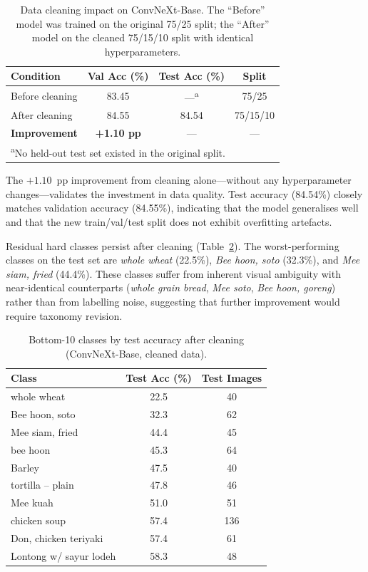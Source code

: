 \begin{table}[ht]
\centering
\caption{Data cleaning impact on ConvNeXt-Base.  The ``Before'' model
         was trained on the original 75/25 split; the ``After'' model on
         the cleaned 75/15/10 split with identical hyperparameters.}
\label{tab:cleaning}
\begin{tabular}{lccc}
\toprule
\textbf{Condition} & \textbf{Val Acc (\%)} & \textbf{Test Acc (\%)} & \textbf{Split} \\
\midrule
Before cleaning & 83.45 & ---\textsuperscript{a} & 75/25 \\
After cleaning  & 84.55 & 84.54 & 75/15/10 \\
\midrule
\textbf{Improvement} & \textbf{+1.10 pp} & --- & --- \\
\bottomrule
\multicolumn{4}{l}{\footnotesize\textsuperscript{a}No held-out test set
  existed in the original split.}
\end{tabular}
\end{table}

The $+1.10$~pp improvement from cleaning alone---without any
hyperparameter changes---validates the investment in data quality.
Test accuracy (84.54\%) closely matches validation accuracy (84.55\%),
indicating that the model generalises well and that the new
train/val/test split does not exhibit overfitting artefacts.

Residual hard classes persist after cleaning (Table~\ref{tab:hard-classes}).
The worst-performing classes on the test set are \emph{whole wheat}
(22.5\%), \emph{Bee hoon, soto} (32.3\%), and \emph{Mee siam, fried}
(44.4\%).  These classes suffer from inherent visual ambiguity with
near-identical counterparts (\emph{whole grain bread}, \emph{Mee soto},
\emph{Bee hoon, goreng}) rather than from labelling noise, suggesting
that further improvement would require taxonomy revision.

\begin{table}[ht]
\centering
\caption{Bottom-10 classes by test accuracy after cleaning
         (ConvNeXt-Base, cleaned data).}
\label{tab:hard-classes}
\begin{tabular}{lcc}
\toprule
\textbf{Class} & \textbf{Test Acc (\%)} & \textbf{Test Images} \\
\midrule
whole wheat             & 22.5 &  40 \\
Bee hoon, soto          & 32.3 &  62 \\
Mee siam, fried         & 44.4 &  45 \\
bee hoon                & 45.3 &  64 \\
Barley                  & 47.5 &  40 \\
tortilla -- plain       & 47.8 &  46 \\
Mee kuah                & 51.0 &  51 \\
chicken soup            & 57.4 & 136 \\
Don, chicken teriyaki   & 57.4 &  61 \\
Lontong w/ sayur lodeh  & 58.3 &  48 \\
\bottomrule
\end{tabular}
\end{table}

